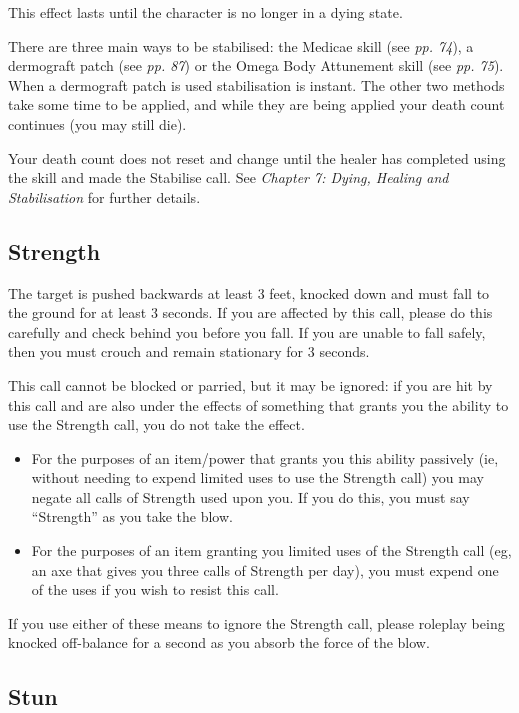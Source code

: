 \documentclass{scrbook}
\begin{document}
This effect lasts until the character is no longer in a dying state.

There are three main ways to be stabilised: the Medicae skill (see \textit{pp. 74}), a dermograft patch (see \textit{pp. 87}) or the Omega Body Attunement skill (see \textit{pp. 75}). When a dermograft patch is used stabilisation is instant. The other two methods take some time to be applied, and while they are being applied your death count continues (you may still die).

Your death count does not reset and change until the healer has completed using the skill and made the Stabilise call. See \textit{Chapter 7: Dying, Healing and Stabilisation} for further details.

\subsection{Strength}

The target is pushed backwards at least 3 feet, knocked down and must fall to the ground for at least 3 seconds. If you are affected by this call, please do this carefully and check behind you before you fall. If you are unable to fall safely, then you must crouch and remain stationary for 3 seconds.

This call cannot be blocked or parried, but it may be ignored: if you are hit by this call and are also under the effects of something that grants you the ability to use the Strength call, you do not take the effect.

\begin{itemize}
\item For the purposes of an item/power that grants you this ability passively (ie, without needing to expend limited uses to use the Strength call) you may negate all calls of Strength used upon you. If you do this, you must say ``Strength'' as you take the blow.

\item For the purposes of an item granting you limited uses of the Strength call (eg, an axe that gives you three calls of Strength per day), you must expend one of the uses if you wish to resist this call.

\end{itemize}
If you use either of these means to ignore the Strength call, please roleplay being knocked off-balance for a second as you absorb the force of the blow.

\subsection{Stun}
\end{document}
